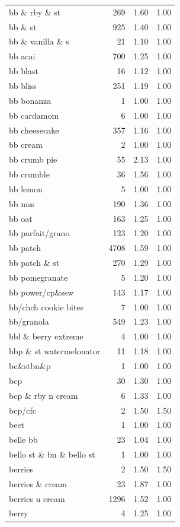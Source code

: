 \begin{table}
\begin{tabular}{lrrr}
bb \& rby \& st & 269 & 1.60 & 1.00 \\
bb \& st & 925 & 1.40 & 1.00 \\
bb \& vanilla \& s & 21 & 1.10 & 1.00 \\
bb acai & 700 & 1.25 & 1.00 \\
bb blast & 16 & 1.12 & 1.00 \\
bb bliss & 251 & 1.19 & 1.00 \\
bb bonanza & 1 & 1.00 & 1.00 \\
bb cardamom & 6 & 1.00 & 1.00 \\
bb cheesecake & 357 & 1.16 & 1.00 \\
bb cream & 2 & 1.00 & 1.00 \\
bb crumb pie & 55 & 2.13 & 1.00 \\
bb crumble & 36 & 1.56 & 1.00 \\
bb lemon & 5 & 1.00 & 1.00 \\
bb mss & 190 & 1.36 & 1.00 \\
bb oat & 163 & 1.25 & 1.00 \\
bb parfait/grano & 123 & 1.20 & 1.00 \\
bb patch & 4708 & 1.59 & 1.00 \\
bb patch \& st & 270 & 1.29 & 1.00 \\
bb pomegranate & 5 & 1.20 & 1.00 \\
bb power/cp\&ssw & 143 & 1.17 & 1.00 \\
bb/chch cookie bites & 7 & 1.00 & 1.00 \\
bb/granola & 549 & 1.23 & 1.00 \\
bbl \& berry extreme & 4 & 1.00 & 1.00 \\
bbp \& st watermelonator & 11 & 1.18 & 1.00 \\
bc\&stbn\&p & 1 & 1.00 & 1.00 \\
bcp & 30 & 1.30 & 1.00 \\
bcp \& rby n cream & 6 & 1.33 & 1.00 \\
bcp/cfc & 2 & 1.50 & 1.50 \\
beet & 1 & 1.00 & 1.00 \\
belle bb & 23 & 1.04 & 1.00 \\
bello st \& bn \& bello st & 1 & 1.00 & 1.00 \\
berries & 2 & 1.50 & 1.50 \\
berries \& cream & 23 & 1.87 & 1.00 \\
berries n cream & 1296 & 1.52 & 1.00 \\
berry & 4 & 1.25 & 1.00 \\

\end{tabular}
\end{table}
